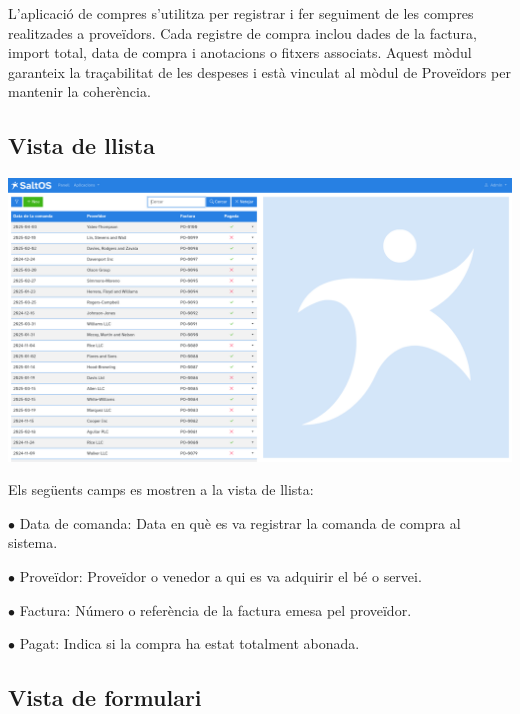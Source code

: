 \documentclass[a4paper]{article}
\begin{document}
L'aplicació de compres s'utilitza per registrar i fer seguiment de les compres realitzades a proveïdors.
Cada registre de compra inclou dades de la factura, import total, data de compra i anotacions o fitxers associats.
Aquest mòdul garanteix la traçabilitat de les despeses i està vinculat al mòdul de Proveïdors per mantenir la coherència.

\hypertarget{toc118}{}
\subsection{Vista de llista}

\begin{center}\includegraphics[width=1\textwidth]{../ujest/snaps/test-screenshots-js-screenshots-purchases-purchase-list-ca-es-1-snap.png}\end{center}

Els següents camps es mostren a la vista de llista:

\begin{compactitem}
\item[\color{myblue}$\bullet$] Data de comanda: Data en què es va registrar la comanda de compra al sistema.
\item[\color{myblue}$\bullet$] Proveïdor: Proveïdor o venedor a qui es va adquirir el bé o servei.
\item[\color{myblue}$\bullet$] Factura: Número o referència de la factura emesa pel proveïdor.
\item[\color{myblue}$\bullet$] Pagat: Indica si la compra ha estat totalment abonada.
\end{compactitem}

\hypertarget{toc119}{}
\subsection{Vista de formulari}
\end{document}
